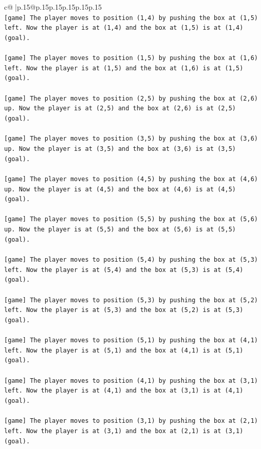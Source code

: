 \documentclass{article}
\begin{document}
{\begin{supertabular}{c@{$\;$}|p{.15\linewidth}@{}p{.15\linewidth}p{.15\linewidth}p{.15\linewidth}p{.15\linewidth}p{.15\linewidth}}
{{{\\ 
\texttt{{[}game{]} The player moves to position (1,4) by pushing the box at (1,5) left. Now the player is at (1,4) and the box at (1,5) is at (1,4) (goal).} \\
\\ 
\texttt{{[}game{]} The player moves to position (1,5) by pushing the box at (1,6) left. Now the player is at (1,5) and the box at (1,6) is at (1,5) (goal).} \\
\\ 
\texttt{{[}game{]} The player moves to position (2,5) by pushing the box at (2,6) up. Now the player is at (2,5) and the box at (2,6) is at (2,5) (goal).} \\
\\ 
\texttt{{[}game{]} The player moves to position (3,5) by pushing the box at (3,6) up. Now the player is at (3,5) and the box at (3,6) is at (3,5) (goal).} \\
\\ 
\texttt{{[}game{]} The player moves to position (4,5) by pushing the box at (4,6) up. Now the player is at (4,5) and the box at (4,6) is at (4,5) (goal).} \\
\\ 
\texttt{{[}game{]} The player moves to position (5,5) by pushing the box at (5,6) up. Now the player is at (5,5) and the box at (5,6) is at (5,5) (goal).} \\
\\ 
\texttt{{[}game{]} The player moves to position (5,4) by pushing the box at (5,3) left. Now the player is at (5,4) and the box at (5,3) is at (5,4) (goal).} \\
\\ 
\texttt{{[}game{]} The player moves to position (5,3) by pushing the box at (5,2) left. Now the player is at (5,3) and the box at (5,2) is at (5,3) (goal).} \\
\\ 
\texttt{{[}game{]} The player moves to position (5,1) by pushing the box at (4,1) left. Now the player is at (5,1) and the box at (4,1) is at (5,1) (goal).} \\
\\ 
\texttt{{[}game{]} The player moves to position (4,1) by pushing the box at (3,1) left. Now the player is at (4,1) and the box at (3,1) is at (4,1) (goal).} \\
\\ 
\texttt{{[}game{]} The player moves to position (3,1) by pushing the box at (2,1) left. Now the player is at (3,1) and the box at (2,1) is at (3,1) (goal).} \\
}}}
\end{supertabular}}
\end{document}
